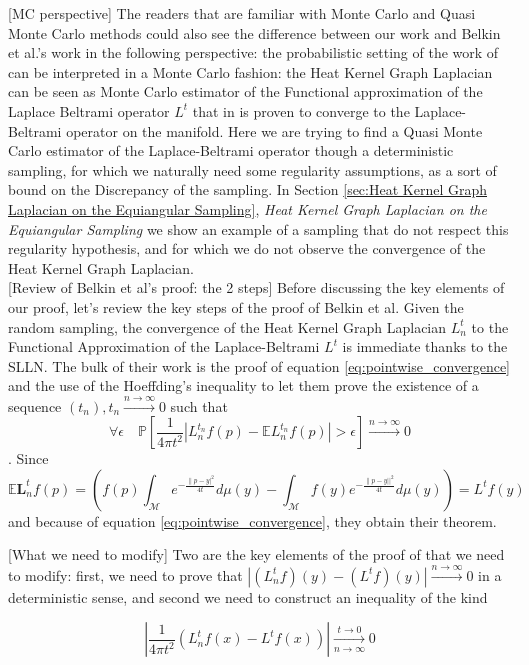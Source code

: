 [MC perspective] The readers that are familiar with Monte Carlo and Quasi Monte Carlo methods could also see the difference between our work and Belkin et al.'s work in the following perspective: the probabilistic setting of the work of \cite{Belkin:2005:TTF:2138147.2138189} can be interpreted in a Monte Carlo fashion: the Heat Kernel Graph Laplacian can be seen as Monte Carlo estimator of the Functional approximation of the Laplace Beltrami operator $L^t$ that in \cite{1} is proven to converge to the Laplace-Beltrami operator on the manifold. Here we are trying to find a Quasi Monte Carlo estimator of the Laplace-Beltrami operator though a deterministic sampling, for which we naturally need some regularity assumptions, as a sort of bound on the Discrepancy of the sampling. In Section \ref{sec:Heat Kernel Graph Laplacian on the Equiangular Sampling}, \textit{Heat Kernel Graph Laplacian on the Equiangular Sampling} we show an example of a sampling that do not respect this regularity hypothesis, and for which we do not observe the convergence of the Heat Kernel Graph Laplacian.\\

[Review of Belkin et al's proof: the 2 steps] Before discussing the key elements of our proof, let's review the key steps of the proof of Belkin et al. Given the random sampling, the convergence of the Heat Kernel Graph Laplacian $L_n^t$ to the Functional Approximation of the Laplace-Beltrami $L^t$ is immediate thanks to the SLLN. The bulk of their work is the proof of equation \ref{eq:pointwise_convergence} and the use of the Hoeffding's inequality to let them prove the existence of a sequence $(t_n), t_n\xrightarrow{n\to\infty}0$ such that $$\forall \epsilon\quad \mathbb{P}\left[\frac{1}{4 \pi t^2}\left|L_{n}^{t_n} f(p)-\mathbb{E} L_{n}^{t_n} f(p)\right|>\epsilon\right] \xrightarrow{n\to\infty} 0$$. Since 
$$\mathbb{E} \mathbf{L}_{n}^{t} f(p)=\left(f(p) \int_{\mathcal{M}} e^{-\frac{ \| p-\left.y\right|^{2}}{4 t}} d \mu(y)-\int_{\mathcal{M}} f(y) e^{-\frac{ \| p-y| |^{2}}{4 t}} d \mu(y)\right)= L^tf(y)$$
and because of equation \ref{eq:pointwise_convergence}, they obtain their theorem.

[What we need to modify] Two are the key elements of the proof of \cite{Belkin:2005:TTF:2138147.2138189} that we need to modify: first, we need to prove that $\left| (L_n^tf)(y)-(L^tf)(y)\right|\xrightarrow{n\to \infty} 0$ in a deterministic sense, and second we need to construct an inequality of the kind

$$\left|\frac{1}{4\pi t^2}\left(L_n^tf(x) - L^tf(x)\right)\right|\xrightarrow[n\to \infty]{t\to 0}0$$

